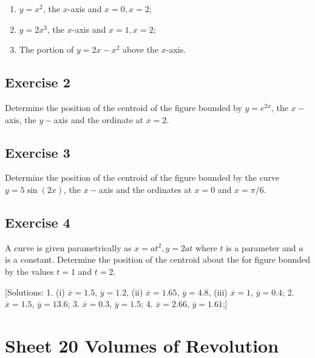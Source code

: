 \documentclass[
  11pt,
  oneside]{book}
\providecommand{\tightlist}{%
  \setlength{\itemsep}{0pt}\setlength{\parskip}{0pt}}
\newcommand{\slide}{}
\theoremstyle{definition}
\theoremstyle{definition}
\theoremstyle{definition}
\theoremstyle{definition}
\theoremstyle{remark}
\begin{document}
\begin{enumerate}
\def\labelenumi{\roman{enumi}.}
\tightlist
\item
  \(y=x^2\), the \(x\)-axis and \(x=0, x=2\);
\item
  \(y=2x^3\), the \(x\)-axis and \(x=1, x=2\);
\item
  The portion of \(y=2x-x^2\) above the \(x\)-axis.
\end{enumerate}

\slide

\subsection*{Exercise 2}\label{exercise-2-10}

Determine the position of the centroid of the figure bounded by \(y = e^{2x}\), the \(x-\)axis, the \(y-\)axis and the ordinate at \(x = 2\).

\slide

\subsection*{Exercise 3}\label{exercise-3-8}

Determine the position of the centroid of the figure bounded by the curve \(y = 5\sin(2x)\), the \(x-\)axis and the ordinates at \(x = 0\) and \(x = \pi/6\).

\slide

\subsection*{Exercise 4}\label{exercise-4-6}

A curve is given parametrically as \(x = at^2, y = 2at\) where \(t\) is a parameter and \(a\) is a constant. Determine the position of the centroid about the for figure bounded by the values \(t = 1\) and \(t = 2\).

{[}Solutions:
1.
(i) \(\overline{x}=1.5\), \(\overline{y}=1.2\),
(ii) \(\overline{x}=1.65\), \(\overline{y}=4.8\),
(iii) \(\overline{x}=1\), \(\overline{y}=0.4\);
2. \(\overline{x}=1.5\), \(\overline{y}=13.6\);
3. \(\overline{x}=0.3\), \(\overline{y}=1.5\);
4. \(\overline{x}=2.66\), \(\overline{y}=1.61\);{]}

\slide

\section{Sheet 20 Volumes of Revolution}\label{sheet-20-volumes-of-revolution}
\end{document}
